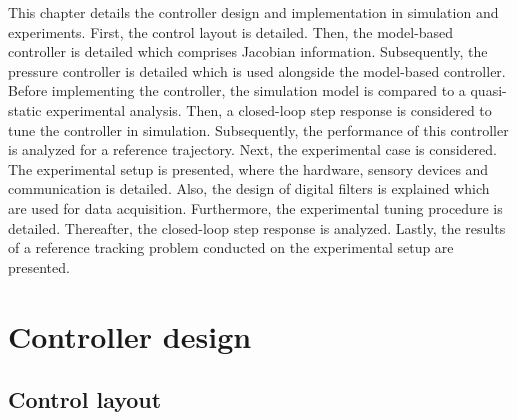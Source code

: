 \label{chap4a}

This chapter details the controller design and implementation in simulation and experiments. First, the control layout is detailed. Then, the model-based controller is detailed which comprises Jacobian information. Subsequently, the pressure controller is detailed which is used alongside the model-based controller. Before implementing the controller, the simulation model is compared to a quasi-static experimental analysis. Then, a closed-loop step response is considered to tune the controller in simulation. Subsequently, the performance of this controller is analyzed for a reference trajectory. Next, the experimental case is considered. The experimental setup is presented, where the hardware, sensory devices and communication is detailed. Also, the design of digital filters is explained which are used for data acquisition. Furthermore, the experimental tuning procedure is detailed. Thereafter, the closed-loop step response is analyzed. Lastly, the results of a reference tracking problem conducted on the experimental setup are presented.



\section{Controller design}


\subsection{Control layout}

